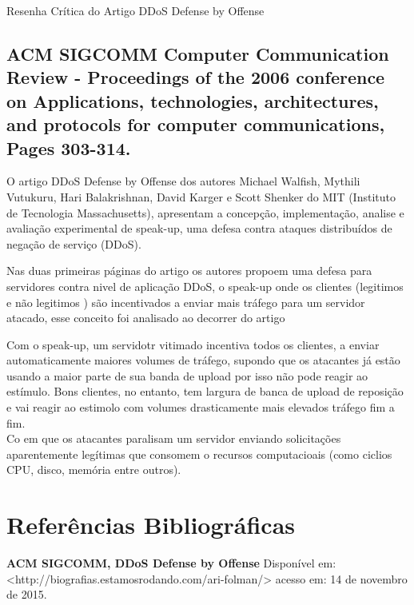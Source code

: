 \documentclass[a4paper,12pt]{article}
\begin{document}
\LARGE
Resenha Crítica do Artigo DDoS Defense by Offense



\large

\subsection*{\textbf{ACM SIGCOMM } Computer Communication Review - Proceedings of the 2006 conference on Applications, technologies, architectures, and protocols for computer communications, Pages 303-314. }

O artigo DDoS Defense by Offense dos autores Michael Walfish, Mythili Vutukuru, Hari Balakrishnan, David Karger  e  Scott Shenker do MIT (Instituto de Tecnologia Massachusetts), apresentam a concepção, implementação, analise e avaliação experimental de speak-up, uma defesa contra ataques distribuídos de negação de serviço (DDoS).

	Nas duas primeiras páginas do artigo os autores propoem uma defesa para servidores contra nivel de aplicação DDoS, o speak-up onde os clientes (legitimos e não legitimos ) são incentivados a enviar mais tráfego para um servidor atacado, esse conceito foi analisado ao decorrer do artigo

	 Com o speak-up, um servidotr vitimado incentiva todos os clientes, a  enviar automaticamente maiores volumes de tráfego, supondo que os atacantes já estão usando a maior parte de sua banda de upload por isso não pode reagir ao estímulo. Bons clientes, no entanto, tem largura de banca de upload de reposição e vai reagir ao estimolo com volumes drasticamente mais elevados tráfego fim a fim.\\

    
    Co em que os atacantes paralisam um servidor enviando solicitações aparentemente legítimas que consomem o recursos computacioais (como ciclios CPU, disco, memória entre outros).

\begin{center}
\end{center}

\section*{Referências Bibliográficas}

\textbf{ACM SIGCOMM, DDoS Defense by Offense} Disponível em:<http://biografias.estamosrodando.com/ari-folman/> acesso em: 14 de novembro de 2015. 
\end{document}
